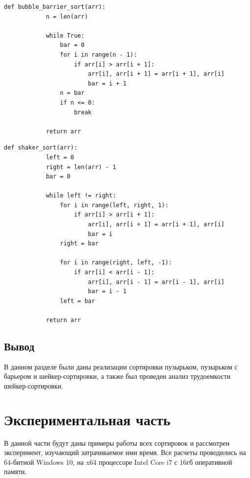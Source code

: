 \documentclass[a4paper, 14pt]{article}
\begin{document}
		\begin{lstlisting}[label=some-code,caption=Алгоритм сортировки пузырьком с барьером]
		def bubble_barrier_sort(arr):
    		n = len(arr)

    		while True:
        		bar = 0
        		for i in range(n - 1):
            		if arr[i] > arr[i + 1]:
                		arr[i], arr[i + 1] = arr[i + 1], arr[i]
                		bar = i + 1
        		n = bar
        		if n <= 0:
            		break

    		return arr
		\end{lstlisting} 
		\begin{lstlisting}[label=some-code,caption=Алгоритм шейкер-сортировки]
		def shaker_sort(arr):
    		left = 0
    		right = len(arr) - 1
    		bar = 0

    		while left != right:
        		for i in range(left, right, 1):
            		if arr[i] > arr[i + 1]:
                		arr[i], arr[i + 1] = arr[i + 1], arr[i]
                		bar = i
        		right = bar

        		for i in range(right, left, -1):
            		if arr[i] < arr[i - 1]:
                		arr[i], arr[i - 1] = arr[i - 1], arr[i]
                		bar = i - 1
        		left = bar

    		return arr
		\end{lstlisting} 
        
   \subsection{Вывод}
   В данном разделе были даны реализации сортировки пузырьком, пузырьком с барьером и шейкер-сортировки, а также был проведен анализ трудоемкости шейкер-сортировки. 
   

       	\newpage
       	
        \section{Экспериментальная часть}
        В данной части будут даны примеры работы всех сортировок и рассмотрен эксперимент, изучающий затрачиваемое ими время. Все расчеты проводились на 64-битной Windows 10, на x64 процессоре Intel Core i7 с 16гб оперативной памяти.
\end{document}
